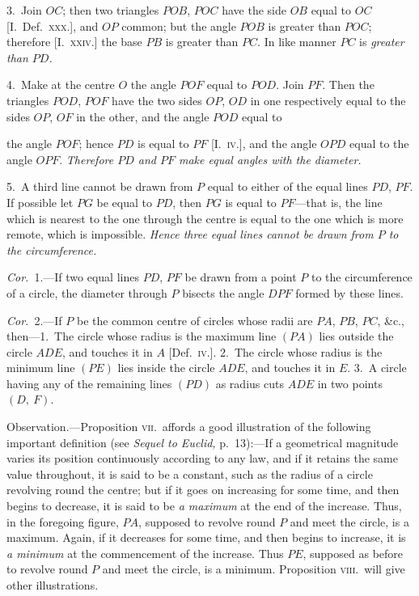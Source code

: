 \documentclass[oneside]{book}
\begin{document}
3.~Join $OC$; then two triangles $POB$, $POC$ have
the side $OB$ equal to $OC$ [I.\ Def.\ \textsc{xxx}.], and $OP$ common;
but the angle $POB$ is greater than $POC$; therefore
[I.\ \textsc{xxiv}.] the base $PB$ is greater than $PC$. In
like manner $PC$ is \emph{greater than $PD$.}

4.~Make at the centre $O$ the angle $POF$ equal to
$POD$. Join $PF$. Then the triangles $POD$, $POF$ have
the two sides $OP$, $OD$ in one respectively equal to the
sides $OP$, $OF$ in the other, and the angle $POD$ equal to

the angle $POF$; hence $PD$ is equal to $PF$ [I.\ \textsc{iv.}], and
the angle $OPD$ equal to the angle $OPF$. \emph{Therefore $PD$
and $PF$ make equal angles with the diameter.}

5.~A third line cannot be drawn from $P$ equal to
either of the equal lines $PD$, $PF$. If possible let $PG$
be equal to $PD$, then $PG$ is equal to $PF$---that is, the
line which is nearest to the one through the centre is
equal to the one which is more remote, which is impossible.
\emph{Hence three equal lines cannot be drawn from
$P$ to the circumference.}

\textit{Cor.}~1.---If two equal lines $PD$, $PF$ be drawn from
a point $P$ to the circumference of a circle, the diameter
through $P$ bisects the angle $DPF$ formed by these
lines.

\textit{Cor.}~2.---If $P$ be the common centre of circles whose
radii are $PA$, $PB$, $PC$, \&c., then---1.\ The circle whose
radius is the maximum line $(PA)$ lies outside the circle
$ADE$, and touches it in $A$ [Def.\ \textsc{iv.}]. 2.~The circle
whose radius is the minimum line $(PE)$ lies inside the
circle $ADE$, and touches it in $E$. 3.~A circle having
any of the remaining lines $(PD)$ as radius cuts $ADE$
in two points $(D,\ F)$.\par\medskip

\begin{footnotesize}
\textsf{Observation.}---Proposition \textsc{vii.}\ affords a good illustration of
the following important definition (see \emph{Sequel to Euclid,} p.~13):---If
a geometrical magnitude varies its position continuously according
to any law, and if it retains the same value throughout,
it is said to be a constant, such as the radius of a circle revolving
round the centre; but if it goes on increasing for some time, and
then begins to decrease, it is said to be \emph{a maximum} at the end of
the increase. Thus, in the foregoing figure, $PA$, supposed to
revolve round $P$ and meet the circle, is a maximum. Again, if it
decreases for some time, and then begins to increase, it is \emph{a minimum}
at the commencement of the increase. Thus $PE$, supposed
as before to revolve round $P$ and meet the circle, is a minimum.
Proposition \textsc{viii.}\ will give other illustrations.
\par\end{footnotesize}
\end{document}
